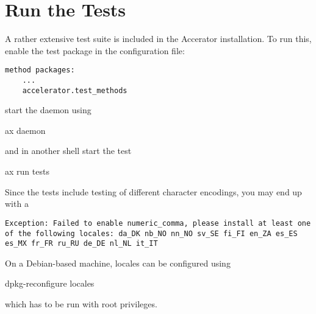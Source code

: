 \section{Run the Tests}
A rather extensive test suite is included in the Accerator
installation.  To run this, enable the test package in the
configuration file:
\begin{verbatim}
method packages:
    ...
    accelerator.test_methods
\end{verbatim}
start the daemon using
\begin{python}
ax daemon
\end{python}
and in another shell start the test
\begin{python}
ax run tests
\end{python}
Since the tests include testing of different character encodings, you may end up with a
\begin{verbatim}
Exception: Failed to enable numeric_comma, please install at least one
of the following locales: da_DK nb_NO nn_NO sv_SE fi_FI en_ZA es_ES
es_MX fr_FR ru_RU de_DE nl_NL it_IT
\end{verbatim}
On a Debian-based machine, locales can be configured using
\begin{shell}
dpkg-reconfigure locales 
\end{shell}
which has to be run with root privileges.



